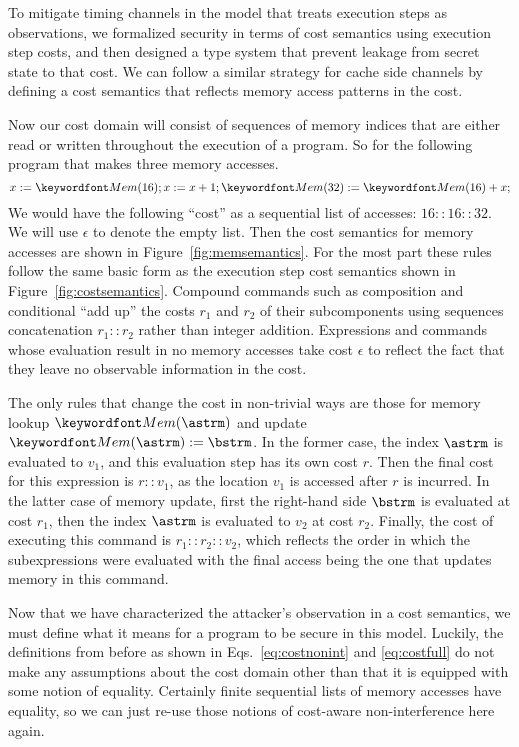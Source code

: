 \documentclass[11pt,twoside]{scrartcl}
\begin{document}
To mitigate timing channels in the model that treats execution steps as observations, we formalized security in terms of cost semantics using execution step costs, and then designed a type system that prevent leakage from secret state to that cost. We can follow a similar strategy for cache side channels by defining a cost semantics that reflects memory access patterns in the cost. 

Now our cost domain will consist of sequences of memory indices that are either read or written throughout the execution of a program. So for the following program that makes three memory accesses.
\[
x := \pderef{16}; x := x + 1; \pderef{32} := \pderef{16} + x;
\]
We would have the following ``cost'' as a sequential list of accesses: $16 :: 16 :: 32$. We will use $\epsilon$ to denote the empty list. Then the cost semantics for memory accesses are shown in Figure~\ref{fig:memsemantics}. For the most part these rules follow the same basic form as the execution step cost semantics shown in Figure~\ref{fig:costsemantics}. Compound commands such as composition and conditional ``add up'' the costs $r_1$ and $r_2$ of their subcomponents using sequences concatenation $r_1 :: r_2$ rather than integer addition. Expressions and commands whose evaluation result in no memory accesses take cost $\epsilon$ to reflect the fact that they leave no observable information in the cost.

The only rules that change the cost in non-trivial ways are those for memory lookup $\pderef{\astrm}$ and update $\pderef{\astrm} := \bstrm$. In the former case, the index $\astrm$ is evaluated to $v_1$, and this evaluation step has its own cost $r$. Then the final cost for this expression is $r :: v_1$, as the location $v_1$ is accessed after $r$ is incurred. In the latter case of memory update, first the right-hand side $\bstrm$ is evaluated at cost $r_1$, then the index $\astrm$ is evaluated to $v_2$ at cost $r_2$. Finally, the cost of executing this command is $r_1 :: r_2 :: v_2$, which reflects the order in which the subexpressions were evaluated with the final access being the one that updates memory in this command.

Now that we have characterized the attacker's observation in a cost semantics, we must define what it means for a program to be secure in this model. Luckily, the definitions from before as shown in Eqs.~\ref{eq:costnonint} and \ref{eq:costfull} do not make any assumptions about the cost domain other than that it is equipped with some notion of equality. Certainly finite sequential lists of memory accesses have equality, so we can just re-use those notions of cost-aware non-interference here again.
\end{document}
